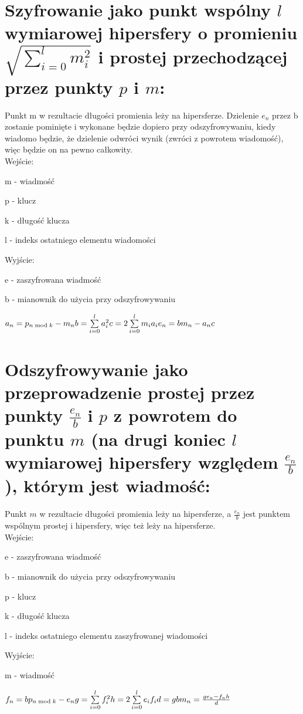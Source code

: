 \documentclass[11pt]{article}
\begin{document}
	\section{
	Szyfrowanie jako punkt wspólny \ensuremath{l} wymiarowej hipersfery o promieniu\ensuremath{\sqrt{\sum\limits_{i=0}^l m^2_i}} i prostej przechodzącej przez punkty \ensuremath{p} i \ensuremath{m}:
	}
	Punkt m w rezultacie długości promienia leży na hipersferze.
	Dzielenie \ensuremath{e_n} przez b zostanie pominięte i wykonane będzie dopiero przy odszyfrowywaniu, kiedy wiadomo będzie, że dzielenie odwróci wynik (zwróci z powrotem wiadomość), więc będzie on na pewno całkowity.\\
	Wejście:
	\begin{description}
	\item m - wiadmość
	\item p - klucz
	\item k - długość klucza
	\item l - indeks ostatniego elementu wiadomości
	\end{description}
	Wyjście:
	\begin{description}
	\item e - zaszyfrowana wiadmość
	\item b - mianownik do użycia przy odszyfrowywaniu
	\end{description} 
	\ensuremath {
		a_n = p_{n \bmod{k}} - m_n \\
		b = \sum\limits_{i=0}^l a_i^2 \\
		c = 2\sum\limits_{i=0}^l m_ia_i \\
		e_n = bm_n - a_nc
	}
	\newpage
		\section{
	Odszyfrowywanie jako przeprowadzenie prostej przez punkty \ensuremath{\frac{e_n}{b}} i \ensuremath{p} z powrotem do punktu \ensuremath{m} (na drugi koniec \ensuremath{l} wymiarowej hipersfery względem \ensuremath{\frac{e_n}{b}}), którym jest wiadmość:
	}
	Punkt \ensuremath{m} w rezultacie długości promienia leży na hipersferze, a \ensuremath{\frac{e_n}{b}} jest punktem wspólnym prostej i hipersfery, więc też leży na hipersferze.\\
	Wejście:
	\begin{description}
	\item e - zaszyfrowana wiadmość
	\item b - mianownik do użycia przy odszyfrowywaniu
	\item p - klucz
	\item k - długość klucza
	\item l - indeks ostatniego elementu zaszyfrowanej wiadomości
	\end{description} 
	Wyjście:
	\begin{description}
	\item m - wiadmość
	\end{description}
	\ensuremath {
		f_n = bp_{n \bmod{k}} - e_n \\
		g = \sum\limits_{i=0}^l f_i^2 \\
		h = 2\sum\limits_{i=0}^l e_if_i \\
		d = gb \\
		m_n = \frac{ge_n - f_nh}{d}
	}
\end{document}
